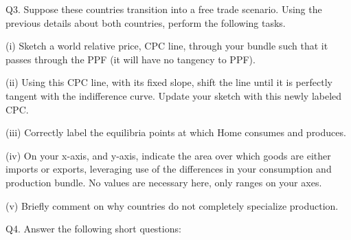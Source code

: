 \documentclass[12pt]{article}
\begin{document}
\newpage


\noindent Q3. Suppose these countries transition into a free trade scenario.
Using the previous details about both countries, perform the following tasks.  

\noindent(i) Sketch a world relative price, CPC line, through your bundle such that it passes through the PPF (it will have no tangency to PPF). 

\noindent(ii) Using this CPC line, with its fixed slope, shift the line until it is perfectly tangent with the indifference curve. Update your sketch with this newly labeled CPC. 
	
\noindent(iii) Correctly label the equilibria points at which Home consumes and produces.
	
\noindent(iv) On your x-axis, and y-axis, indicate the area over which goods are either imports or exports, leveraging use of the differences in your consumption and production bundle. 
No values are necessary here, only ranges on your axes.

\noindent(v) Briefly comment on why countries do not completely specialize production. 


\newpage


\noindent Q4. Answer the following short questions:
\end{document}
